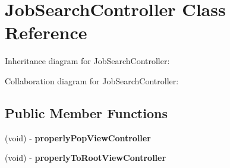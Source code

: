 \hypertarget{interface_job_search_controller}{
\section{\-Job\-Search\-Controller \-Class \-Reference}
\label{interface_job_search_controller}
}


\-Inheritance diagram for \-Job\-Search\-Controller\-:


\-Collaboration diagram for \-Job\-Search\-Controller\-:
\subsection*{\-Public \-Member \-Functions}
\begin{DoxyCompactItemize}
\item 
\hypertarget{interface_job_search_controller_a0752b1269498bf95d64766ed81e9f9ab}{
(void) -\/ {\bfseries properly\-Pop\-View\-Controller}}
\label{interface_job_search_controller_a0752b1269498bf95d64766ed81e9f9ab}

\item 
\hypertarget{interface_job_search_controller_a0b1f8d74dbc7115b59fbf692641d060d}{
(void) -\/ {\bfseries properly\-To\-Root\-View\-Controller}}
\label{interface_job_search_controller_a0b1f8d74dbc7115b59fbf692641d060d}

\end{DoxyCompactItemize}
